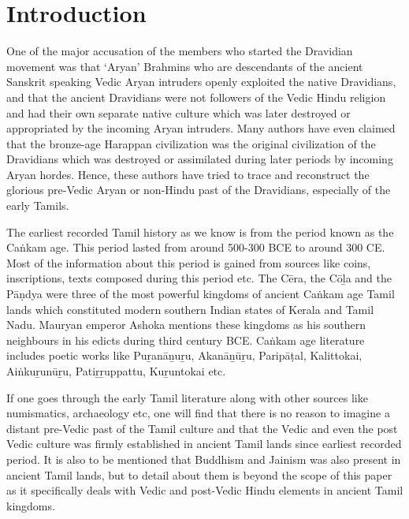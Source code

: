 \section*{Introduction}

One of the major accusation of the members who started the Dravidian movement was that ‘Aryan’ Brahmins who are descendants of the ancient Sanskrit speaking Vedic Aryan intruders openly exploited the native Dravidians, and that the ancient Dravidians were not followers of the Vedic Hindu religion and had their own separate native culture which was later destroyed or appropriated by the incoming Aryan intruders. Many authors have even claimed that the bronze-age Harappan civilization was the original civilization of the Dravidians which was destroyed or assimilated during later periods by incoming Aryan hordes. Hence, these authors have tried to trace and reconstruct the glorious pre-Vedic Aryan or non-Hindu past of the Dravidians, especially of the early Tamils.

The earliest recorded Tamil history as we know is from the period known as the Caṅkam age. This period lasted from around 500-300 BCE to around 300 CE. Most of the information about this period is gained from sources like coins, inscriptions, texts composed during this period etc. The Cēra, the Cōḻa and the Pāṇdya were three of the most powerful kingdoms of ancient Caṅkam age Tamil lands which constituted modern southern Indian states of Kerala and Tamil Nadu. Mauryan emperor Ashoka mentions these kingdoms as his southern neighbours in his edicts during third century BCE. Caṅkam age literature includes poetic works like Puṟanāṉuṟu, Akanāṉūṟu, Paripāṭal, Kalittokai, Aiṅkuṟunūṟu, Patiṟṟuppattu, Kuṟuntokai etc.

If one goes through the early Tamil literature along with other sources like numismatics, archaeology etc, one will find that there is no reason to imagine a distant pre-Vedic past of the Tamil culture and that the Vedic and even the post Vedic culture was firmly established in ancient Tamil lands since earliest recorded period. It is also to be mentioned that Buddhism and Jainism was also present in ancient Tamil lands, but to detail about them is beyond the scope of this paper as it specifically deals with Vedic and post-Vedic Hindu elements in ancient Tamil kingdoms.


